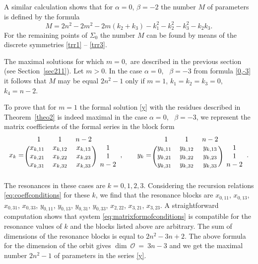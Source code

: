 \documentclass{article}
\theoremstyle{plain}
\begin{document}
A similar calculation shows that for  $\alpha = 0$, $\beta = - 2$  the number $M$ of parameters is defined by the formula
\begin{equation}\label{0,-2}
    M = 2 n^2 - 2 m^2 - 2 m (k_2 + k_3) - k_1^2 - k_2^2 - k_3^2 - k_2 k_3.
\end{equation}
For the remaining points of $\Sigma_0$ the number $M$ can be found by means of the discrete symmetries \eqref{trr1} -- \eqref{trr3}.

The maximal solutions for which $m=0,$ are described in the previous section (see Section~\ref{sec211}). Let $m>0$.
In the case $\alpha=0$, \, $\beta=-3$ from formula \eqref{0,-3} it follows that $M$ may be equal $2 n^2-1$ only if $m=1$, $k_1=k_2=k_3=0$, $k_4=n-2$.

To prove that for $m = 1$ the formal solution \eqref{y} with the residues described in Theorem~\ref{theo2} is indeed maximal in the case $\alpha=0$, \, $\beta=-3$,
we represent the matrix coefficients of the formal series in the block form
\begin{gather*}
    x_k
    =
    \begin{blockarray}{cccc}
      \,\,\, 1 & 1 & n - 2 &  \\
    \begin{block}{(ccc)c}
      x_{k, 11} & x_{k, 12} & x_{k, 13} & 1  \\
      x_{k, 21} & x_{k, 22} & x_{k, 23} & 1  \\
      x_{k, 31} & x_{k, 32} & x_{k, 33} & n - 2  \\
    \end{block}
    \end{blockarray}
    , \qquad
    y_k
    =
    \begin{blockarray}{cccc}
      \,\,\, 1 & 1 & n - 2 &  \\
    \begin{block}{(ccc)c}
      y_{k, 11} & y_{k, 12} & y_{k, 13} & 1  \\
      y_{k, 21} & y_{k, 22} & y_{k, 23} & 1  \\
      y_{k, 31} & y_{k, 32} & y_{k, 33} & n - 2  \\
    \end{block}
    \end{blockarray}.
\end{gather*}
The resonances in these cases are $k = 0, 1, 2, 3$. Considering the recursion relations \eqref{eq:coeffconditions} for these $k$, we find that the resonance blocks are $x_{0, 11}$, $x_{0, 13}$, $x_{0, 31}$, $x_{0, 33}$, $y_{0, 11}$, $y_{0, 13}$, $y_{0, 31}$, $y_{0, 33}$, $x_{2, 22}$, $x_{3, 21}$, $x_{3, 23}$. 
A straightforward computation shows that system \eqref{eq:matrixformofconditions} is compatible for the resonance values of $k$ and the blocks listed above are arbitrary.
The sum of dimensions of the resonance blocks is equal to $2 n^2 - 3 n + 2$.  The above formula for the dimension of the orbit gives $\dim~\mathcal{O}~=~3 n-3$ and we get the maximal number $2 n^2-1$ of parameters in the series \eqref{y}. 
	
\end{document}
